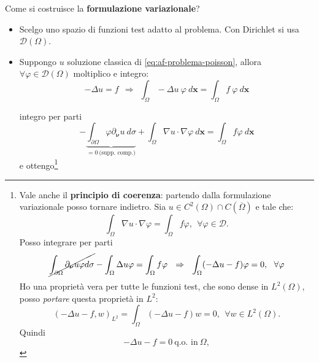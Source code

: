 \documentclass[10pt,a4paper,twoside,openright]{book}
\newcommand{\x}{\mathbf{x}}
\begin{document}
Come si costruisce la \textbf{formulazione variazionale}?
\begin{itemize}
	\item Scelgo uno spazio di funzioni test adatto al problema. Con Dirichlet si usa $\displaystyle \mathcal{D}( \Omega )$.
	\item Suppongo $\displaystyle u$ soluzione classica di \eqref{eq:af-problema-poisson}, allora $\displaystyle \forall \varphi \in \mathcal{D}( \Omega )$ moltiplico e integro:
	      \begin{equation*}
	      	-\Delta u=f\ \ \Rightarrow \ \ \int _{\Omega } -\Delta u\ \varphi \ d\x =\int _{\Omega } f\ \varphi \ d\x
	      \end{equation*}
	      
	      integro per parti
	      \begin{equation*}
	      	-\underbrace{\int _{\partial \Omega } \varphi \partial _{\bm{\nu }} u\ d\sigma }_{=0\ \text{(supp. comp.)}} +\int _{\Omega } \nabla u\cdotp \nabla \varphi \ d\x =\int _{\Omega } f\varphi \ d\x
	      \end{equation*}
	      \newpage
	      e ottengo\footnote{Vale anche il \textbf{principio di coerenza}: partendo dalla formulazione variazionale posso tornare indietro. Sia $\displaystyle u\in C^{2}( \Omega ) \cap C(\overline{\Omega })$ e tale che:
	      	\begin{equation*}
	      		\int _{\Omega } \nabla u\cdotp \nabla \varphi =\int _{\Omega } f\varphi ,\ \ \forall \varphi \in \mathcal{D} .
	      	\end{equation*}
	      	Posso integrare per parti
	      	\begin{equation*}
	      		\cancel{\int _{\partial \Omega } \partial _{\bm{\nu}} u\varphi d\sigma } -\int _{\Omega } \Delta u\varphi =\int _{\Omega } f\varphi \ \ \Rightarrow \ \ \int _{\Omega }( -\Delta u-f) \varphi =0,\ \ \forall \varphi 
	      	\end{equation*}
	      	Ho una proprietà vera per tutte le funzioni test, che sono dense in $\displaystyle L^{2}( \Omega )$, posso \textit{portare} questa proprietà in $\displaystyle L^{2}$:
	      	\begin{equation*}
	      		( -\Delta u-f,w)_{L^{2}} =\int _{\Omega }( -\Delta u-f) w=0,\ \ \forall w\in L^{2}( \Omega ) .
	      	\end{equation*}
	      	Quindi 
	      	\begin{equation*}
	      		-\Delta u-f=0\ \text{q.o. in} \ \Omega ,
	      	\end{equation*}
}
\end{itemize}
\end{document}
